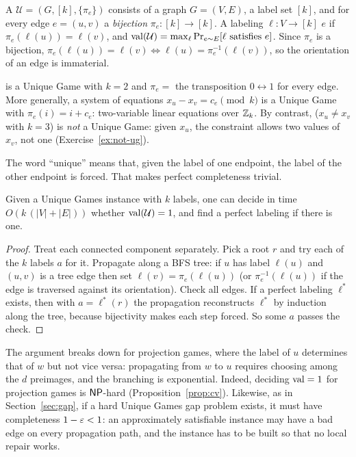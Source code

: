 \begin{definition}\label{def:ug}
A  $\mathcal U=(G,[k],\{\pi_e\})$ consists of a graph $G=(V,E)$, a label
set $[k]$, and for every edge $e=(u,v)$ a \emph{bijection} $\pi_e\colon[k]\to[k]$.  A labeling
$\ell\colon V\to[k]$  $e$ if $\pi_e(\ell(u))=\ell(v)$, and
$\operatorname{val}(\mathcal U)=\max_\ell\Pr_{e\sim E}[\ell\text{ satisfies }e]$.  Since $\pi_e$ is a bijection,
$\pi_e(\ell(u))=\ell(v)\iff\ell(u)=\pi_e^{-1}(\ell(v))$, so the orientation of an edge is immaterial.
\end{definition}

\begin{example}\label{ex:ug-examples}
 is a Unique Game with $k=2$ and $\pi_e=$ the transposition $0\leftrightarrow1$ for every edge.
More generally, a system of equations $x_u-x_v=c_e\pmod k$ is a Unique Game with $\pi_e(i)=i+c_e$: two-variable
linear equations over $\mathbb{Z}_k$.  By contrast,  ($x_u\ne x_v$ with $k=3$) is \emph{not} a Unique Game:
given $x_u$, the constraint allows two values of $x_v$, not one (Exercise~\ref{ex:not-ug}).
\end{example}

The word ``unique'' means that, given the label of one endpoint, the label of the other endpoint is forced.
That makes perfect completeness trivial.

\begin{proposition}\label{prop:ug-easy}
Given a Unique Games instance with $k$ labels, one can decide in time $O(k\,(|V|+|E|))$ whether $\operatorname{val}(\mathcal U)=1$, and find a
perfect labeling if there is one.
\end{proposition}
\begin{proof}
Treat each connected component separately.  Pick a root $r$ and try each of the $k$ labels $a$ for it.  Propagate
along a BFS tree: if $u$ has label $\ell(u)$ and $(u,v)$ is a tree edge then set $\ell(v)=\pi_e(\ell(u))$
(or $\pi_e^{-1}(\ell(u))$ if the edge is traversed against its orientation).  Check all edges.
If a perfect labeling $\ell^\ast$ exists, then with $a=\ell^\ast(r)$ the propagation reconstructs $\ell^\ast$ by induction along
the tree, because bijectivity makes each step forced.  So some $a$ passes the check.
\end{proof}

\begin{remark}
The argument breaks down for projection games, where the label of $u$ determines that of $w$ but
not vice versa: propagating from $w$ to $u$ requires choosing among the $d$ preimages, and the
branching is exponential.  Indeed, deciding $\operatorname{val}=1$ for projection games is $\mathsf{NP}$-hard (Proposition~\ref{prop:cv}).
Likewise, as in Section~\ref{sec:gap}, if a hard Unique Games gap problem exists, it must have
completeness $1-\varepsilon<1$: an approximately satisfiable instance may have a bad edge on every
propagation path, and the instance has to be built so that no local repair works.
\end{remark}

